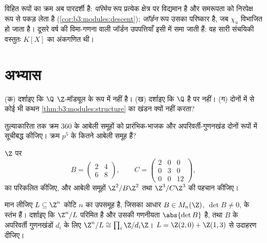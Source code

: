 \begin{remark}\label{rem:b3:modules:overview}
विहित रूपों का क्रम अब पारदर्शी है: \emph{परिमेय} रूप प्रत्येक
क्षेत्र पर विद्यमान है और समरूपता को निरपेक्ष रूप से पकड़ लेता
है (\cref{cor:b3:modules:descent}); \emph{जॉर्डन} रूप उसका परिष्कार है, जब $\chi_u$ विभाजित
हो जाता है। दूसरे वर्ष की विमा-गणना वाली जॉर्डन उपपत्तियाँ इसी
में समा जाती हैं: वह सारी संचयिकी वस्तुतः  $K[X]$ का अंकगणित
थी।
\end{remark}

\section{अभ्यास}

\begin{exercise}[$\star$]\label{exo:b3:modules:1}
(क) दर्शाइए कि $\Q$ $\Z$-मॉड्यूल के रूप में  नहीं
है।
(ख) दर्शाइए कि $\Q$  है पर  नहीं।
(ग) दोनों में से कोई भी कथन \cref{thm:b3:modules:structure} का खंडन क्यों नहीं करता?
\end{exercise}

\begin{exercise}[$\star$]\label{exo:b3:modules:2}
तुल्याकारिता तक क्रम $360$ के आबेली समूहों को प्रारंभिक-भाजक और
अपरिवर्ती-गुणनखंड दोनों रूपों में सूचीबद्ध कीजिए। क्रम $p^5$ के
कितने आबेली समूह हैं?
\end{exercise}

\begin{exercise}[$\star$]\label{exo:b3:modules:3}
$\Z$ पर
\[
B = \begin{pmatrix} 2 & 4\\ 6 & 8 \end{pmatrix},
\qquad
C = \begin{pmatrix} 2 & 0 & 0\\ 0 & 3 & 0\\ 0 & 0 & 12
\end{pmatrix},
\]
का  परिकलित कीजिए, और आबेली समूहों $\Z^2/B\Z^2$
तथा $\Z^3/C\Z^3$ की पहचान कीजिए।
\end{exercise}

\begin{exercise}[$\star\star$]\label{exo:b3:modules:4}
मान लीजिए $L \subseteq \Z^n$ कोटि $n$ का उपसमूह है, जिसका आधार $B \in M_n(\Z)$,
$\det B \neq 0$, के स्तंभ हैं। दर्शाइए कि $\Z^n/L$ परिमित है और उसकी गणनीयता
$\abs{\det B}$ है, तथा $B$ के अपरिवर्ती गुणनखंडों $d_i$ के लिए $\Z^n/L
\cong \prod_i \Z/d_i\Z$।
$L = \Z(2,0) + \Z(1,3)$ से उदाहरण दीजिए।
\end{exercise}

